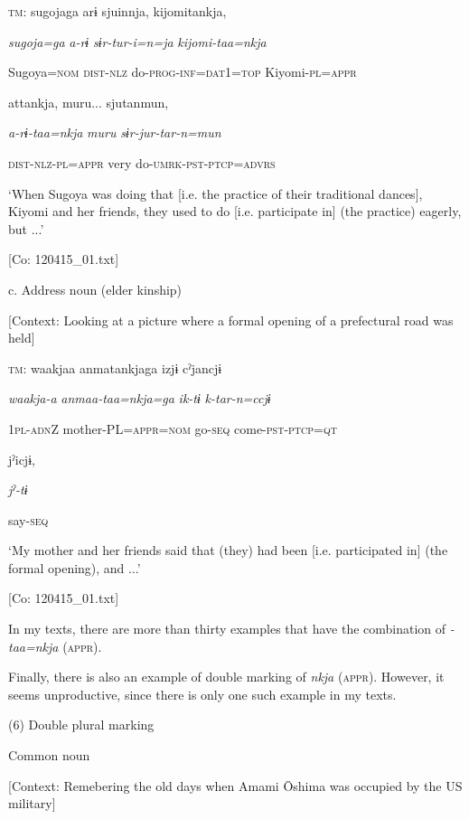     \textsc{tm}:  sugojaga  arɨ  sjuinnja,  kijomitankja,

      \textit{sugoja=ga}  \textit{a-rɨ}  \textit{sɨr-tur-i=n=ja}  \textit{kijomi-taa=nkja}

      Sugoya=\textsc{nom}  \textsc{dist}-\textsc{nlz}  do-\textsc{prog}-\textsc{inf}=\textsc{dat}1=\textsc{top}  Kiyomi-\textsc{pl}=\textsc{appr}

      attankja,  muru...  sjutanmun,

      \textit{a-rɨ-taa=nkja}  \textit{muru}  \textit{sɨr-jur-tar-n=mun}

      \textsc{dist}-\textsc{nlz}-\textsc{pl}=\textsc{appr}  very  do-\textsc{umrk}-\textsc{pst}-\textsc{ptcp}=\textsc{advrs}

      ‘When Sugoya was doing that [i.e. the practice of their traditional dances], Kiyomi and her friends, they used to do [i.e. participate in] (the practice) eagerly, but ...’

      [Co: 120415\_01.txt]

  c.  Address noun (elder kinship)

    [Context: Looking at a picture where a formal opening of a prefectural road was held]

    \textsc{tm}:  waakjaa  anmatankjaga  izjɨ  cˀjancjɨ

      \textit{waakja-a}  \textit{anmaa-taa=nkja=ga}  \textit{ik-tɨ}  \textit{k-tar-n=ccjɨ}

      1\textsc{pl}-\textsc{adn}Z  mother-PL=\textsc{appr}=\textsc{nom}  go-\textsc{seq}  come-\textsc{pst}-\textsc{ptcp}=\textsc{qt}

      jˀicjɨ,

      \textit{jˀ-tɨ}

      say-\textsc{seq}

      ‘My mother and her friends said that (they) had been [i.e. participated in] (the formal opening), and ...’

      [Co: 120415\_01.txt]

In my texts, there are more than thirty examples that have the combination of \textit{{}-taa=nkja} (\textsc{appr}).

Finally, there is also an example of double marking of \textit{nkja} (\textsc{appr}). However, it seems unproductive, since there is only one such example in my texts.

(6)  Double plural marking

  Common noun

  [Context: Remebering the old days when Amami Ōshima was occupied by the US military]

